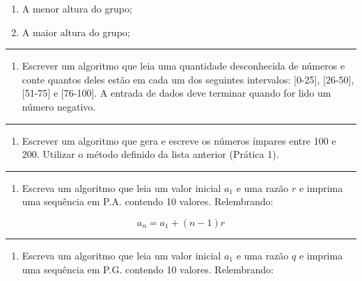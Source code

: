 \documentclass[12pt,a4paper]{article}
\providecommand{\tightlist}{%
      \setlength{\itemsep}{0pt}\setlength{\parskip}{0pt}}
\begin{document}
\begin{enumerate}
\def\labelenumi{\alph{enumi}.}
\item
  A menor altura do grupo;
\item
  A maior altura do grupo;
\end{enumerate}

    \begin{center}\rule{0.5\linewidth}{0.5pt}\end{center}

\begin{enumerate}
\def\labelenumi{\arabic{enumi}.}
\setcounter{enumi}{1}
\tightlist
\item
  Escrever um algoritmo que leia uma quantidade desconhecida de números
  e conte quantos deles estão em cada um dos seguintes intervalos:
  {[}0-25{]}, {[}26-50{]}, {[}51-75{]} e {[}76-100{]}. A entrada de
  dados deve terminar quando for lido um número negativo.
\end{enumerate}

    \begin{center}\rule{0.5\linewidth}{0.5pt}\end{center}

\begin{enumerate}
\def\labelenumi{\arabic{enumi}.}
\setcounter{enumi}{2}
\tightlist
\item
  Escrever um algoritmo que gera e escreve os números ímpares entre 100
  e 200. Utilizar o método definido da lista anterior (Prática 1).
\end{enumerate}

    \begin{center}\rule{0.5\linewidth}{0.5pt}\end{center}

\begin{enumerate}
\def\labelenumi{\arabic{enumi}.}
\setcounter{enumi}{3}
\tightlist
\item
  Escreva um algoritmo que leia um valor inicial \(a_1\) e uma razão
  \(r\) e imprima uma sequência em P.A. contendo 10 valores.
  Relembrando:
\end{enumerate}

\[a_n = a_1 + (n-1)r\]

    \begin{center}\rule{0.5\linewidth}{0.5pt}\end{center}

\begin{enumerate}
\def\labelenumi{\arabic{enumi}.}
\setcounter{enumi}{4}
\tightlist
\item
  Escreva um algoritmo que leia um valor inicial \(a_1\) e uma razão
  \(q\) e imprima uma sequência em P.G. contendo 10 valores.
  Relembrando:
\end{enumerate}
\end{document}
